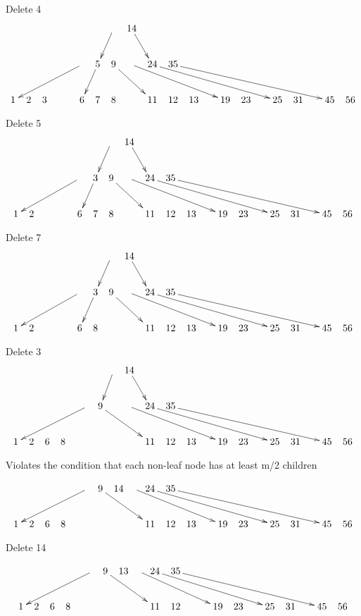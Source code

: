 \documentclass[a4paper]{article}
\begin{document}
Delete 4
$$\xymatrix @C=5pt {
  &  & & & & &            &     \ar[dl]      &  14   \ar[dr]       &               &     & \\
  &  & & & &  \ar[dlllll] &  5 \ar[dl] & 9 \ar[drr] &  \ar[drrrrr] &  24 \ar[drrrrrrr] & 35 \ar[drrrrrrrrr] \\
1 & 2 & 3 &  &    & 6 & 7 & 8 &   & 11 & 12 & 13 & & 19 & 23 &  & 25 & 31 &  & 45 & 56 \\
}$$

Delete 5
$$\xymatrix @C=5pt {
  &  & & & & &            &     \ar[dl]      &  14   \ar[dr]       &               &     & \\
  &  & & & &  \ar[dlllll] &  3 \ar[dl] & 9 \ar[drr] &  \ar[drrrrr] &  24 \ar[drrrrrrr] & 35 \ar[drrrrrrrrr] \\
1 & 2 &  &  &    & 6 & 7 & 8 &   & 11 & 12 & 13 & & 19 & 23 &  & 25 & 31 &  & 45 & 56 \\
}$$

Delete 7
$$\xymatrix @C=5pt {
  &  & & & & &            &     \ar[dl]      &  14   \ar[dr]       &               &     & \\
  &  & & & &  \ar[dlllll] &  3 \ar[dl] & 9 \ar[drr] &  \ar[drrrrr] &  24 \ar[drrrrrrr] & 35 \ar[drrrrrrrrr] \\
1 & 2 &  &  &    & 6 & 8 &  &   & 11 & 12 & 13 & & 19 & 23 &  & 25 & 31 &  & 45 & 56 \\
}$$

Delete 3
$$\xymatrix @C=5pt {
  &  & & & & &            &     \ar[dl]      &  14   \ar[dr]       &               &     & \\
  &  & & & &  \ar[dlllll] &  9 \ar[drrr] &  &  \ar[drrrrr] &  24 \ar[drrrrrrr] & 35 \ar[drrrrrrrrr] \\
1 & 2 & 6 & 8 &    &  &  &  &   & 11 & 12 & 13 & & 19 & 23 &  & 25 & 31 &  & 45 & 56 \\
}$$

Violates the condition that each non-leaf node has at least m/2 children

$$\xymatrix @C=5pt {
  &  & & & &  \ar[dlllll] &  9 \ar[drrr] & 14 &  \ar[drrrrr] &  24 \ar[drrrrrrr] & 35 \ar[drrrrrrrrr] \\
1 & 2 & 6 & 8 &    &  &  &  &   & 11 & 12 & 13 & & 19 & 23 &  & 25 & 31 &  & 45 & 56 \\
}$$

Delete 14

$$\xymatrix @C=5pt {
  &  & & & &  \ar[dlllll] &  9 \ar[drrr] & 13 &  \ar[drrrrr] &  24 \ar[drrrrrrr] & 35 \ar[drrrrrrrrr] \\
1 & 2 & 6 & 8 &    &  &  &  &   & 11 & 12 &  & & 19 & 23 &  & 25 & 31 &  & 45 & 56 \\
}$$

\end{document}
